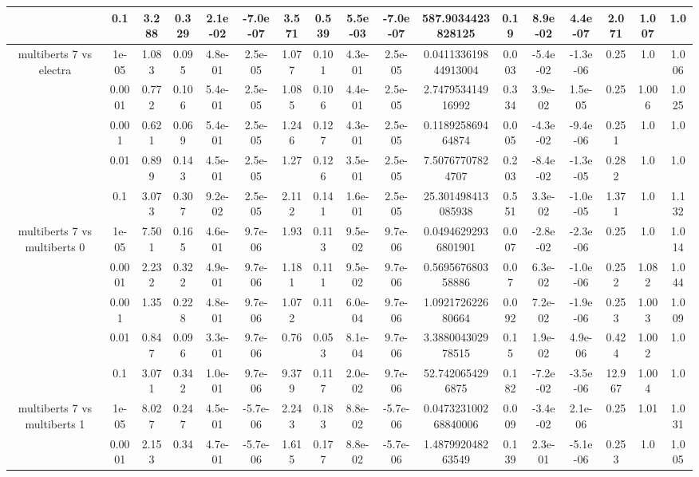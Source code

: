 \begin{tabular}{|c|c|c|c|c|c|c|c|c|c|c|c|c|c|c|c|c|}
 & 0.1 & 3.288 & 0.329 & 2.1e-02 & -7.0e-07 & 3.571 & 0.539 & 5.5e-03 & -7.0e-07 & 587.9034423828125 & 0.19 & 8.9e-02 & 4.4e-07 & 2.071 & 1.007 & 1.0 \\
\hline
\multirow{5}{*}{multiberts 7 vs electra } & 1e-05 & 1.083 & 0.095 & 4.8e-01 & 2.5e-05 & 1.077 & 0.101 & 4.3e-01 & 2.5e-05 & 0.041133619844913004 & 0.003 & -5.4e-02 & -1.3e-06 & 0.25 & 1.0 & 1.006 \\
 & 0.0001 & 0.772 & 0.106 & 5.4e-01 & 2.5e-05 & 1.085 & 0.106 & 4.4e-01 & 2.5e-05 & 2.747953414916992 & 0.334 & 3.9e-02 & 1.5e-05 & 0.25 & 1.006 & 1.025 \\
 & 0.001 & 0.621 & 0.069 & 5.4e-01 & 2.5e-05 & 1.246 & 0.127 & 4.3e-01 & 2.5e-05 & 0.118925869464874 & 0.005 & -4.3e-02 & -9.4e-06 & 0.251 & 1.0 & 1.0 \\
 & 0.01 & 0.899 & 0.143 & 4.5e-01 & 2.5e-05 & 1.27 & 0.126 & 3.5e-01 & 2.5e-05 & 7.50767707824707 & 0.203 & -8.4e-02 & -1.3e-05 & 0.282 & 1.0 & 1.0 \\
 & 0.1 & 3.073 & 0.307 & 9.2e-02 & 2.5e-05 & 2.112 & 0.141 & 1.6e-01 & 2.5e-05 & 25.301498413085938 & 0.551 & 3.3e-02 & -1.0e-05 & 1.371 & 1.0 & 1.132 \\
\hline
\multirow{5}{*}{multiberts 7 vs multiberts 0} & 1e-05 & 7.501 & 0.165 & 4.6e-01 & 9.7e-06 & 1.93 & 0.113 & 9.5e-02 & 9.7e-06 & 0.04946292936801901 & 0.007 & -2.8e-02 & -2.3e-06 & 0.25 & 1.0 & 1.014 \\
 & 0.0001 & 2.232 & 0.322 & 4.9e-01 & 9.7e-06 & 1.181 & 0.111 & 9.5e-02 & 9.7e-06 & 0.569567680358886 & 0.07 & 6.3e-02 & -1.0e-06 & 0.252 & 1.082 & 1.044 \\
 & 0.001 & 1.35 & 0.228 & 4.8e-01 & 9.7e-06 & 1.072 & 0.11 & 6.0e-04 & 9.7e-06 & 1.092172622680664 & 0.092 & 7.2e-02 & -1.9e-06 & 0.253 & 1.003 & 1.009 \\
 & 0.01 & 0.847 & 0.096 & 3.3e-01 & 9.7e-06 & 0.76 & 0.053 & 8.1e-04 & 9.7e-06 & 3.388004302978515 & 0.15 & 1.9e-02 & 4.9e-06 & 0.424 & 1.002 & 1.0 \\
 & 0.1 & 3.071 & 0.342 & 1.0e-01 & 9.7e-06 & 9.379 & 0.117 & 2.0e-02 & 9.7e-06 & 52.7420654296875 & 0.182 & -7.2e-02 & -3.5e-06 & 12.967 & 1.004 & 1.0 \\
\hline
\multirow{5}{*}{multiberts 7 vs multiberts 1} & 1e-05 & 8.027 & 0.247 & 4.5e-01 & -5.7e-06 & 2.243 & 0.183 & 8.8e-02 & -5.7e-06 & 0.047323100268840006 & 0.009 & -3.4e-02 & 2.1e-06 & 0.25 & 1.01 & 1.031 \\
 & 0.0001 & 2.153 & 0.34 & 4.7e-01 & -5.7e-06 & 1.615 & 0.177 & 8.8e-02 & -5.7e-06 & 1.487992048263549 & 0.139 & 2.3e-01 & -5.1e-06 & 0.253 & 1.0 & 1.005 \\

\end{tabular}
